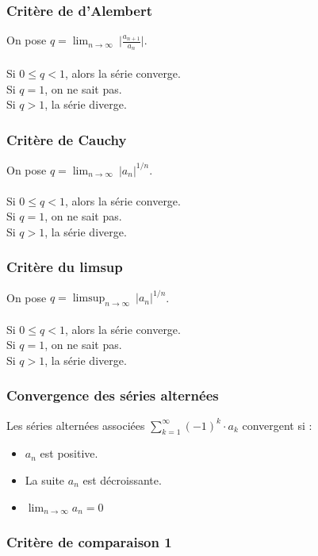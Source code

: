 \documentclass{article}
\begin{document}
\subsubsection{Critère de d'Alembert}

On pose $ q = \lim_{n\to\infty}\ \lvert \frac{a_{n+1}}{a_n} \lvert $.\\\\
Si $ 0 \leq q < 1 $, alors la série converge.\\
Si $ q = 1 $, on ne sait pas.\\
Si $ q > 1 $, la série diverge.

\subsubsection{Critère de Cauchy}

On pose $ q = \lim_{n\to\infty}\ {\lvert a_{n}\lvert}^{1/n} $.\\\\
Si $ 0 \leq q < 1 $, alors la série converge.\\
Si $ q = 1 $, on ne sait pas.\\
Si $ q > 1 $, la série diverge.

\subsubsection{Critère du limsup}

On pose $ q = \limsup_{n\to\infty}\ {\lvert a_{n}\lvert}^{1/n} $.\\\\
Si $ 0 \leq q < 1 $, alors la série converge.\\
Si $ q = 1 $, on ne sait pas.\\
Si $ q > 1 $, la série diverge.

\subsubsection{Convergence des séries alternées}

Les séries alternées associées $ \sum_{k=1}^{\infty} (-1)^k \cdot a_k $ convergent si :
\begin{itemize}
    \item $ a_n $ est positive.
    \item La suite $ a_n $ est décroissante.
    \item $ \lim_{n\to\infty} a_n = 0 $
\end{itemize}

\subsubsection{Critère de comparaison 1}
\end{document}
